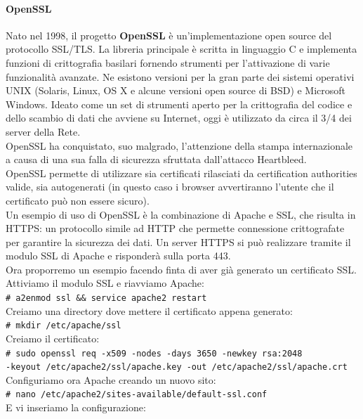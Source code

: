 \documentclass[a4paper]{report}
\newcommand\tab[1][1cm]{\hspace*{#1}}
\begin{document}
\paragraph{OpenSSL} Nato nel 1998, il progetto \textbf{OpenSSL} è un'implementazione open source del protocollo SSL/TLS. La libreria principale è scritta in linguaggio C e implementa funzioni di crittografia basilari fornendo strumenti per l'attivazione di varie funzionalità avanzate. Ne esistono versioni per la gran parte dei sistemi operativi UNIX (Solaris, Linux, OS X e alcune versioni open source di BSD) e Microsoft Windows. Ideato come un set di strumenti aperto per la crittografia del codice e dello scambio di dati che avviene su Internet, oggi è utilizzato da circa il 3/4 dei server della Rete.\\
OpenSSL ha conquistato, suo malgrado, l'attenzione della stampa internazionale a causa di una sua falla di sicurezza sfruttata dall'attacco Heartbleed.\\
OpenSSL permette di utilizzare sia certificati rilasciati da certification authorities valide, sia autogenerati (in questo caso i browser avvertiranno l'utente che il certificato può non essere sicuro).\\
Un esempio di uso di OpenSSL è la combinazione di Apache e SSL, che risulta in HTTPS: un protocollo simile ad HTTP che permette connessione crittografate per garantire la sicurezza dei dati. Un server HTTPS si può realizzare tramite il modulo SSL di Apache e risponderà sulla porta 443.\\
Ora proporremo un esempio facendo finta di aver già generato un certificato SSL.\\
Attiviamo il modulo SSL e riavviamo Apache:\\
\tab\texttt{\# a2enmod ssl \&\& service apache2 restart}\\
Creiamo una directory dove mettere il certificato appena generato:\\
\tab\texttt{\# mkdir /etc/apache/ssl}\\
Creiamo il certificato:\\
\tab\texttt{\# sudo openssl req -x509 -nodes -days 3650 -newkey rsa:2048}\\
\tab\texttt{-keyout /etc/apache2/ssl/apache.key -out /etc/apache2/ssl/apache.crt}\\
Configuriamo ora Apache creando un nuovo sito:\\
\tab\texttt{\# nano /etc/apache2/sites-available/default-ssl.conf}\\
E vi inseriamo la configurazione:\\
\end{document}

